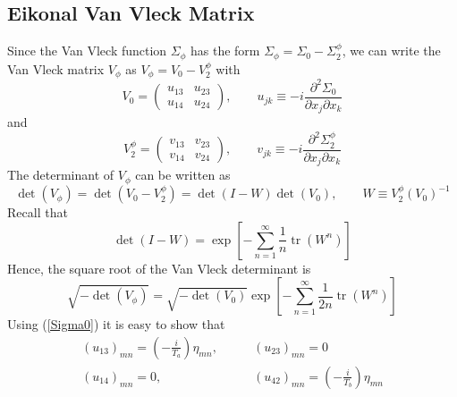 \subsection{Eikonal Van Vleck Matrix\label{EVVMat}}
Since the Van Vleck function $\Sigma_{\phi}$ has the form $\Sigma_{\phi} = \Sigma_{0} - \Sigma_{2}^{\phi}$, we can write the Van Vleck matrix $V_{\phi}$ as $V_{\phi} = V_{0} - V_{2}^{\phi}$ with
\begin{equation}
	V_{0} = \begin{pmatrix}
	u_{13} & u_{23} \\
	u_{14} & u_{24}
	\end{pmatrix}, \qquad u_{jk} \equiv - i \frac{\partial^{2} \Sigma_{0}}{\partial x_{j} \partial x_{k}}
\end{equation}
and
\begin{equation}
	V_{2}^{\phi} = \begin{pmatrix}
	v_{13} & v_{23} \\
	v_{14} & v_{24}
	\end{pmatrix}, \qquad v_{jk} \equiv - i \frac{\partial^{2} \Sigma_{2}^{\phi}}{\partial x_{j} \partial x_{k}}
\end{equation}
The determinant of $V_{\phi}$ can be written as
\begin{equation}
	\det{(V_{\phi})} = \det{(V_{0} - V_{2}^{\phi})} = \det{(I - W)} \det{(V_{0})}, \qquad W \equiv V_{2}^{\phi}(V_{0})^{-1}
\end{equation}
Recall that
\begin{equation}
	\det{(I - W)} = \exp{\left[ - \sum_{n = 1}^{\infty} \frac{1}{n} \operatorname{tr}{(W^{n})} \right]}
\end{equation}
Hence, the square root of the Van Vleck determinant is
\begin{equation}
	\sqrt{- \det{(V_{\phi})}} = \sqrt{- \det{(V_{0})}} \exp{\left[ - \sum_{n = 1}^{\infty} \frac{1}{2n} \operatorname{tr}{(W^{n})} \right]} \label{FullVVDet}
\end{equation}
Using (\ref{Sigma0}) it is easy to show that
\begin{equation}
\begin{split}
	(u_{13})_{mn} = \left(- \frac{i}{T_{a}} \right) \eta_{mn}, &\qquad (u_{23})_{mn} = 0 \\
	(u_{14})_{mn} = 0, &\qquad (u_{42})_{mn} = \left(- \frac{i}{T_{b}} \right) \eta_{mn}
\end{split} \label{uMats}
\end{equation}
